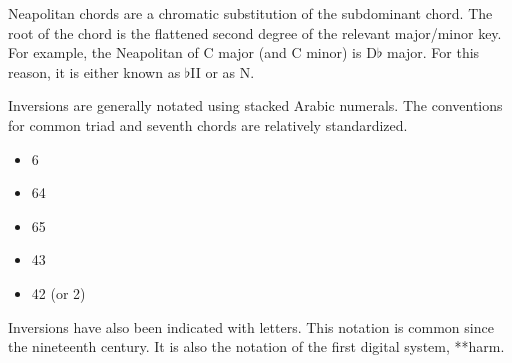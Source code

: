Neapolitan chords are a chromatic substitution of the
subdominant chord. The root of the chord is the flattened
second degree of the relevant major/minor key. For example,
the Neapolitan of C major (and C minor) is D$\flat$ major.
For this reason, it is either known as $\flat$II or as N.

Inversions are generally notated using stacked Arabic
numerals. The conventions for common triad and seventh
chords are relatively standardized.

\begin{itemize}
    \item 6
    \item 64
    \item 65
    \item 43
    \item 42 (or 2)
\end{itemize}

Inversions have also been indicated with letters. This
notation is common since the nineteenth century. It is also
the notation of the first digital system, **harm.
